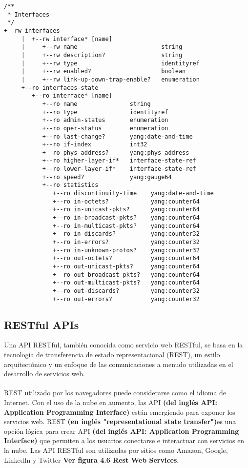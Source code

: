 \lstset{language=java, caption=Interface YANG, label=lst:Interface}
\begin{lstlisting}
/** 
 * Interfaces
 */
+--rw interfaces
     |  +--rw interface* [name]
     |     +--rw name                        string
     |     +--rw description?                string
     |     +--rw type                        identityref
     |     +--rw enabled?                    boolean
     |     +--rw link-up-down-trap-enable?   enumeration
     +--ro interfaces-state
        +--ro interface* [name]
           +--ro name               string
           +--ro type               identityref
           +--ro admin-status       enumeration
           +--ro oper-status        enumeration
           +--ro last-change?       yang:date-and-time
           +--ro if-index           int32
           +--ro phys-address?      yang:phys-address
           +--ro higher-layer-if*   interface-state-ref
           +--ro lower-layer-if*    interface-state-ref
           +--ro speed?             yang:gauge64
           +--ro statistics
              +--ro discontinuity-time    yang:date-and-time
              +--ro in-octets?            yang:counter64
              +--ro in-unicast-pkts?      yang:counter64
              +--ro in-broadcast-pkts?    yang:counter64
              +--ro in-multicast-pkts?    yang:counter64
              +--ro in-discards?          yang:counter32
              +--ro in-errors?            yang:counter32
              +--ro in-unknown-protos?    yang:counter32
              +--ro out-octets?           yang:counter64
              +--ro out-unicast-pkts?     yang:counter64
              +--ro out-broadcast-pkts?   yang:counter64
              +--ro out-multicast-pkts?   yang:counter64
              +--ro out-discards?         yang:counter32
              +--ro out-errors?           yang:counter32
\end{lstlisting}


\subsection{RESTful APIs}
\label{sec:RESTful APIs}

Una API RESTful, también conocida como servicio web RESTful, se basa en la tecnología de transferencia de estado representacional (REST), un estilo arquitectónico y un enfoque de las comunicaciones a menudo utilizadas en el desarrollo de servicios web.\\
\\
REST utilizado por los navegadores puede considerarse como el idioma de Internet. Con el uso de la nube en aumento, las API \textbf{(del inglés API: Application Programming Interface)} están emergiendo para exponer los servicios web. REST \textbf{(en inglés "representational state transfer")}es una opción lógica para crear API \textbf{(del inglés API: Application Programming Interface)} que permiten a los usuarios conectarse e interactuar con servicios en la nube. Las API RESTful son utilizadas por sitios como Amazon, Google, LinkedIn y Twitter \textbf{Ver figura 4.6 Rest Web Services}.

